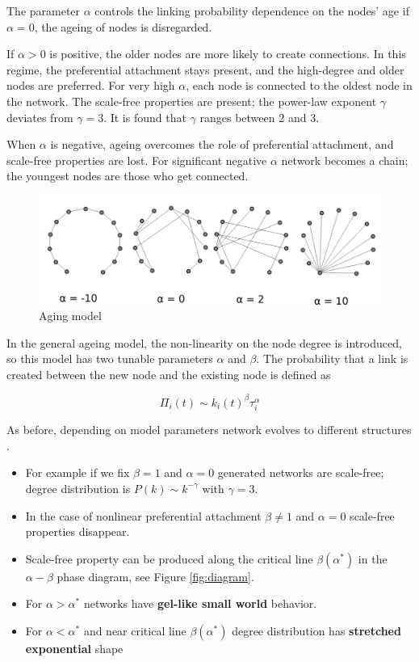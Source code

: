 The parameter $\alpha$ controls the linking probability dependence on the nodes' age if $\alpha=0$, the ageing of nodes is disregarded. 

If $\alpha>0$ is positive, the older nodes are more likely to create connections. In this regime, the preferential attachment stays present, and the high-degree and older nodes are preferred. For very high $\alpha$, each node is connected to the oldest node in the network. The scale-free properties are present; the power-law exponent $\gamma$ deviates from $\gamma=3$. It is found that $\gamma$ ranges between $2$ and $3$. 

When $\alpha$ is negative, ageing overcomes the role of preferential attachment, and scale-free properties are lost. For significant negative $\alpha$ network becomes a chain; the youngest nodes are those who get connected. 

\begin{figure}[!ht]
	\centering
	\includegraphics[width=1\linewidth]{figures/aging_nets.png}
	\caption{Aging model}
	\label{fig:aging}
\end{figure}

In the general ageing model, the non-linearity on the node degree is introduced, so this model has two tunable parameters $\alpha $ and $\beta$. The probability that a link is created between the new node and the existing node is defined as

\begin{equation}
\Pi_{i}(t)\sim k_{i}(t)^{\beta}\tau_{i}^{\alpha} 
\label{eq:1}
\end{equation}

As before, depending on model parameters network evolves to different structures \cite{hajra2004}.  
\begin{itemize}
	\item For example if we fix $\beta=1$ and $\alpha=0$ generated networks are scale-free; degree distribution is $P(k) \sim k^{-\gamma}$ with $\gamma=3$.
	\item In the case of nonlinear preferential attachment $\beta \neq 1$ and $\alpha=0$ scale-free properties disappear. 
	\item Scale-free property can be produced along the critical line $\beta(\alpha^{*})$ in the $\alpha-\beta$ phase diagram, see Figure \ref{fig:diagram}.
	
	\item For $\alpha>\alpha^{*}$ networks have \textbf{gel-like small world} behavior.
	
	\item For $\alpha<\alpha^{*}$ and near critical line $\beta(\alpha^{*})$ degree distribution has \textbf{stretched exponential} shape
	
\end{itemize}

